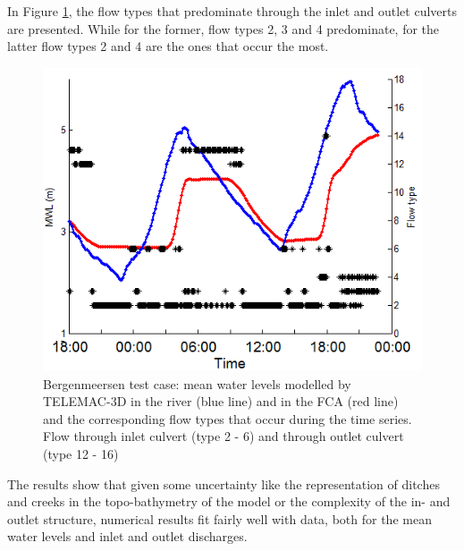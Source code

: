 In Figure \ref{fig:bergenmeersen_figure9}, the flow types that predominate through the inlet and outlet culverts are presented. 
While for the former, flow types 2, 3 and 4 predominate, for the latter flow types 2 and 4 are the ones that occur the most.

\begin{figure}[H]
\begin{center}
  \includegraphics[scale=1]{figure9.png}
\end{center}
\caption{Bergenmeersen test case: mean water levels modelled by TELEMAC-3D in the river (blue line) 
and in the FCA (red line) and the corresponding flow types that occur during the time series. 
Flow through inlet culvert (type 2 - 6) and through outlet culvert (type 12 - 16)}
\label{fig:bergenmeersen_figure9}
\end{figure}

The results show that given some uncertainty like the representation of ditches and creeks in the topo-bathymetry of the model 
or the complexity of the in- and outlet structure, numerical results fit fairly well with data, 
both for the mean water levels and inlet and outlet discharges.

%



